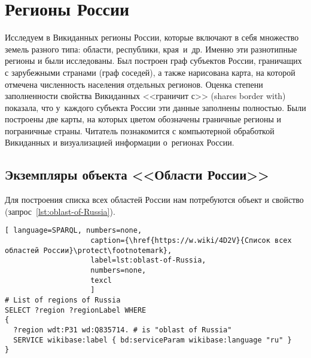 ﻿\chapter{Регионы России}
\label{ch:oblast-of-Russia}
%
\label{question:q_subjects_of_Russia_3}


Исследуем в Викиданных регионы России, которые включают в себя множество земель разного 
типа: области, республики, края~и~др. Именно эти разнотипные регионы 
и были исследованы. 
Был построен граф субъектов России, граничащих с зарубежными странами (граф соседей), 
а также нарисована карта, 
на которой отмечена численность населения отдельных регионов. 
Оценка степени заполненности свойства Викиданных <<граничит с>> (shares border with) 
показала, что у~каждого субъекта России эти данные заполнены полностью. 
Были построены две карты, на которых цветом обозначены граничные регионы и пограничные страны.
Читатель познакомится с компьютерной обработкой Викиданных и визуализацией 
информации о~регионах России.


\section{Экземпляры объекта <<Области России>>}

Для построения списка всех областей России нам потребуются объект 
 и свойство  
(запрос~\ref{lst:oblast-of-Russia}).


\begin{lstlisting}[ language=SPARQL, numbers=none,
                    caption={\href{https://w.wiki/4D2V}{Список всех областей России}\protect\footnotemark},
                    label=lst:oblast-of-Russia,
                    numbers=none,
                    texcl 
                    ]
# List of regions of Russia
SELECT ?region ?regionLabel WHERE
{
  ?region wdt:P31 wd:Q835714. # is "oblast of Russia"
  SERVICE wikibase:label { bd:serviceParam wikibase:language "ru" }
}
\end{lstlisting}%


